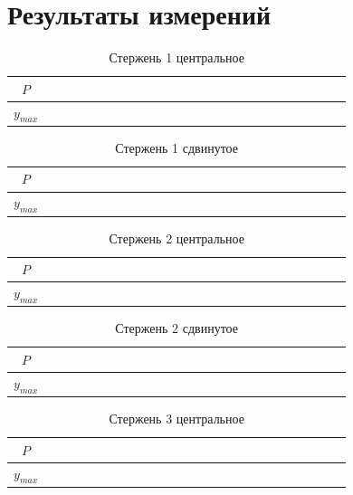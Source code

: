 \documentclass[a4paper,12pt]{article} %
\begin{document}
    \section{Результаты измерений}
    \begin{table}[!ht]
        \centering
        \begin{tabular}{|c|c|c|c|c|c|c|c|c|c|c}
            \hline
        $ P $   & ~~~ & ~~~ & ~~~ & ~~~ & ~~~ & ~~~ & ~~~ &  ~~~ \\ \hline
        $y_{max}$ & ~~~ & ~~~ & ~~~ & ~~~ & ~~~ & ~~~ & ~~~ &  ~~~\\ \hline
        \end{tabular}
        \caption{Стержень 1 центральное}
    \end{table}
    \begin{table}[!ht]
        \centering
        \begin{tabular}{|c|c|c|c|c|c|c|c|c|c|c}
            \hline
        $ P $   & ~~~ & ~~~ & ~~~ & ~~~ & ~~~ & ~~~ & ~~~ &  ~~~ \\ \hline
        $y_{max}$ & ~~~ & ~~~ & ~~~ & ~~~ & ~~~ & ~~~ & ~~~ &  ~~~\\ \hline
        \end{tabular}
        \caption{Стержень 1 сдвинутое}
    \end{table}
    \begin{table}[!ht]
        \centering
        \begin{tabular}{|c|c|c|c|c|c|c|c|c|c|c}
            \hline
        $ P $   & ~~~ & ~~~ & ~~~ & ~~~ & ~~~ & ~~~ & ~~~ &  ~~~ \\ \hline
        $y_{max}$ & ~~~ & ~~~ & ~~~ & ~~~ & ~~~ & ~~~ & ~~~ &  ~~~\\ \hline
        \end{tabular}
        \caption{Стержень 2 центральное}
    \end{table}
    \begin{table}[!ht]
        \centering
        \begin{tabular}{|c|c|c|c|c|c|c|c|c|c|c}
            \hline
        $ P $   & ~~~ & ~~~ & ~~~ & ~~~ & ~~~ & ~~~ & ~~~ &  ~~~ \\ \hline
        $y_{max}$ & ~~~ & ~~~ & ~~~ & ~~~ & ~~~ & ~~~ & ~~~ &  ~~~\\ \hline
        \end{tabular}
        \caption{Стержень 2 сдвинутое}
    \end{table}
    \begin{table}[!ht]
        \centering
        \begin{tabular}{|c|c|c|c|c|c|c|c|c|c|c}
            \hline
        $ P $   & ~~~ & ~~~ & ~~~ & ~~~ & ~~~ & ~~~ & ~~~ &  ~~~ \\ \hline
        $y_{max}$ & ~~~ & ~~~ & ~~~ & ~~~ & ~~~ & ~~~ & ~~~ &  ~~~\\ \hline
        \end{tabular}
        \caption{Стержень 3 центральное}
    \end{table}
\end{document}
